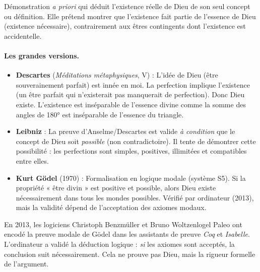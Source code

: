 \documentclass[11pt]{article}
\begin{document}
\begin{definition}
Démonstration \emph{a priori} qui déduit l'existence réelle de Dieu de son seul concept ou définition. Elle prétend montrer que l'existence fait partie de l'essence de Dieu (existence nécessaire), contrairement aux êtres contingents dont l'existence est accidentelle.
\end{definition}

\paragraph{Les grandes versions.}
\begin{itemize}
    \item \textbf{Descartes} (\emph{Méditations métaphysiques}, V) : L'idée de Dieu (être souverainement parfait) est innée en moi. La perfection implique l'existence (un être parfait qui n'existerait pas manquerait de perfection). Donc Dieu existe. L'existence est inséparable de l'essence divine comme la somme des angles de 180° est inséparable de l'essence du triangle.
    \item \textbf{Leibniz} : La preuve d'Anselme/Descartes est valide \emph{à condition} que le concept de Dieu soit \emph{possible} (non contradictoire). Il tente de démontrer cette possibilité : les perfections sont simples, positives, illimitées et compatibles entre elles.
    \item \textbf{Kurt Gödel} (1970) : Formalisation en logique modale (système S5). Si la propriété « être divin » est positive et possible, alors Dieu existe nécessairement dans tous les mondes possibles. Vérifié par ordinateur (2013), mais la validité dépend de l'acceptation des axiomes modaux.
\end{itemize}

\begin{savaistu}
En 2013, les logiciens Christoph Benzmüller et Bruno Woltzenlogel Paleo ont encodé la preuve modale de Gödel dans les assistants de preuve \emph{Coq} et \emph{Isabelle}. L'ordinateur a validé la déduction logique : \emph{si} les axiomes sont acceptés, la conclusion suit nécessairement. Cela ne prouve pas Dieu, mais la rigueur formelle de l'argument.
\end{savaistu}
\end{document}
